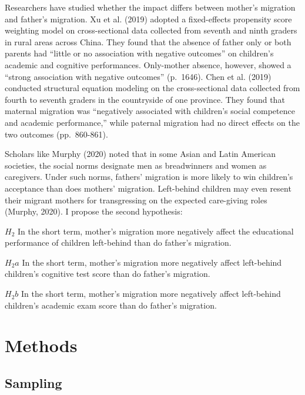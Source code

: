 \documentclass[
  man,floatsintext]{apa7}
\begin{document}
Researchers have studied whether the impact differs between mother's migration and father's migration. Xu et al. (2019) adopted a fixed-effects propensity score weighting model on cross-sectional data collected from seventh and ninth graders in rural areas across China. They found that the absence of father only or both parents had ``little or no association with negative outcomes'' on children's academic and cognitive performances. Only-mother absence, however, showed a ``strong association with negative outcomes'' (p.~1646). Chen et al. (2019) conducted structural equation modeling on the cross-sectional data collected from fourth to seventh graders in the countryside of one province. They found that maternal migration was ``negatively associated with children's social competence and academic performance,'' while paternal migration had no direct effects on the two outcomes (pp.~860-861).

Scholars like Murphy (2020) noted that in some Asian and Latin American societies, the social norms designate men as breadwinners and women as caregivers. Under such norms, fathers' migration is more likely to win children's acceptance than does mothers' migration. Left-behind children may even resent their migrant mothers for transgressing on the expected care-giving roles (Murphy, 2020). I propose the second hypothesis:

\(H_2\) In the short term, mother's migration more negatively affect the educational performance of children left-behind than do father's migration.

\(H_2a\) In the short term, mother's migration more negatively affect left-behind children's cognitive test score than do father's migration.

\(H_2b\) In the short term, mother's migration more negatively affect left-behind children's academic exam score than do father's migration.

\newpage

\hypertarget{methods}{%
\section{Methods}\label{methods}}

\hypertarget{sampling}{%
\subsection{Sampling}\label{sampling}}
\end{document}
